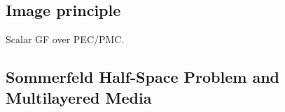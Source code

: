 \subsection{Image principle}

Scalar GF over PEC/PMC. \cite[p. 250]{Sommerfeld1964}





\subsection{Sommerfeld Half-Space Problem and Multilayered Media}

	
		
		
		
		



